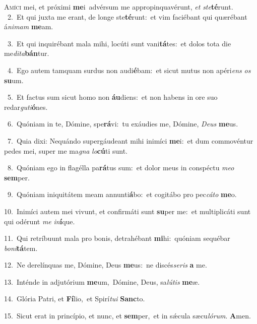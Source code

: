 \lettrine{\initial\textcolor{\initialcolor}{A}}{míci} mei, et próximi \textbf{me}\-i~\star advérsum me appropinquavérunt, \textit{et} \textit{ste}\-\textbf{té}runt.\\
{\numbfont\textcolor{\numbcolor}{~2.}}~Et qui juxta me erant, de longe ste\-\textbf{té}\-runt:~\star et vim faciébant qui quærébant á\-\textit{ni}\-\textit{mam} \textbf{me}\-am.\par
{\numbfont\textcolor{\numbcolor}{~3.}}~Et qui inquirébant mala mihi, locúti sunt vani\-\textbf{tá}\-tes:~\star et dolos tota die me\-\textit{di}\-\textit{ta}\textbf{bán}tur.\par
{\numbfont\textcolor{\numbcolor}{~4.}}~Ego autem tamquam surdus non audi\-\textbf{é}\-bam:~\star et sicut mutus non apéri\textit{ens} \textit{os} \textbf{su}\-um.\par
{\numbfont\textcolor{\numbcolor}{~5.}}~Et factus sum sicut homo non \textbf{áu}\-diens:~\star et non habens in ore suo redar\-\textit{gu}\-\textit{ti}\textbf{ó}nes.\par
{\numbfont\textcolor{\numbcolor}{~6.}}~Quóniam in te, Dómine, spe\-\textbf{rá}\-vi:~\star tu exáudies me, Dómine, \textit{De}\-\textit{us} \textbf{me}\-us.\par
{\numbfont\textcolor{\numbcolor}{~7.}}~Quia dixi: Nequándo supergáudeant mihi inimíci \textbf{me}\-i:~\star et dum commovéntur pedes mei, super me ma\textit{gna} \textit{lo}\-\textbf{cú}ti sunt.\par
{\numbfont\textcolor{\numbcolor}{~8.}}~Quóniam ego in flagélla pa\-\textbf{rá}\-tus sum:~\star et dolor meus in conspéctu \textit{me}\-\textit{o} \textbf{sem}\-per.\par
{\numbfont\textcolor{\numbcolor}{~9.}}~Quóniam iniquitátem meam annunti\-\textbf{á}\-bo:~\star et cogitábo pro pec\-\textit{cá}\-\textit{to} \textbf{me}\-o.\par
{\numbfont\textcolor{\numbcolor}{10.}}~Inimíci autem mei vivunt, et confirmáti sunt \textbf{su}\-per me:~\star et multiplicáti sunt qui odérunt \textit{me} \textit{in}\-\textbf{í}que.\par
{\numbfont\textcolor{\numbcolor}{11.}}~Qui retríbuunt mala pro bonis, detrahébant \textbf{mi}\-hi:~\star quóniam sequébar \textit{bo}\-\textit{ni}\textbf{tá}tem.\par
{\numbfont\textcolor{\numbcolor}{12.}}~Ne derelínquas me, Dómine, Deus \textbf{me}\-us:~\star ne discés\-\textit{se}\-\textit{ris} \textbf{a} me.\par
{\numbfont\textcolor{\numbcolor}{13.}}~Inténde in adjutórium \textbf{me}\-um,~\star Dómine, Deus, sa\-\textit{lú}\-\textit{tis} \textbf{me}\-æ.\par
{\numbfont\textcolor{\numbcolor}{14.}}~Glória Patri, et \textbf{Fí}\-lio,~\star et Spirí\-\textit{tu}\-\textit{i} \textbf{Sanc}\-to.\par
{\numbfont\textcolor{\numbcolor}{15.}}~Sicut erat in princípio, et nunc, et \textbf{sem}\-per,~\star et in sǽcula sæcu\-\textit{ló}\-\textit{rum}. \textbf{A}\-men.\par
